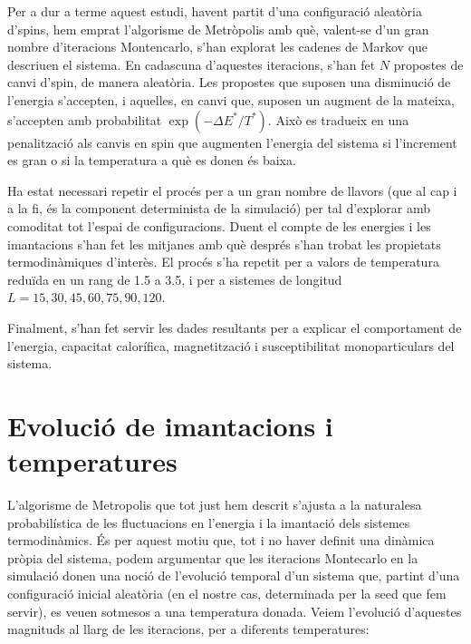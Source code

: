 \documentclass[a4paper]{article}
\begin{document}
Per a dur a terme aquest estudi, havent partit d'una configuració aleatòria d'spins, hem emprat l'algorisme de Metròpolis amb què, valent-se d'un gran nombre d'iteracions Montencarlo, s'han explorat les cadenes de Markov que descriuen el sistema. En cadascuna d'aquestes iteracions, s'han fet $N$ propostes de canvi d'spin, de manera aleatòria. Les propostes que suposen una disminució de l'energia s'accepten, i aquelles, en canvi que, suposen un augment de la mateixa, s'accepten amb probabilitat $\exp\left(-\Delta E^*/T^*\right)$. Això es tradueix en una penalització als canvis en spin que augmenten l'energia del sistema si l'increment es gran o si la temperatura a què es donen és baixa.

Ha estat necessari repetir el procés per a un gran nombre de llavors (que al cap i a la fi, és la component determinista de la simulació) per tal d'explorar amb comoditat tot l'espai de configuracions. Duent el compte de les energies i les imantacions s'han fet les mitjanes amb què després s'han trobat les propietats termodinàmiques d'interès. El procés s'ha repetit per a valors de temperatura reduïda en un rang de 1.5 a 3.5, i per a sistemes de longitud $L=15,30,45,60,75,90,120$.

Finalment, s'han fet servir les dades resultants per a explicar el comportament de l'energia, capacitat calorífica, magnetització i susceptibilitat monoparticulars del sistema.

\section{Evolució de imantacions i temperatures}

L'algorisme de Metropolis que tot just hem descrit s'ajusta a la naturalesa probabilística de les fluctuacions en l'energia i la imantació dels sistemes termodinàmics. És per aquest motiu que, tot i no haver definit una dinàmica pròpia del sistema, podem argumentar que les iteracions Montecarlo en la simulació donen una noció de l'evolució temporal d'un sistema que, partint d'una configuració inicial aleatòria (en el nostre cas, determinada per la seed que fem servir), es veuen sotmesos a una temperatura donada. Veiem l'evolució d'aquestes magnituds al llarg de les iteracions, per a diferents temperatures:
\end{document}
